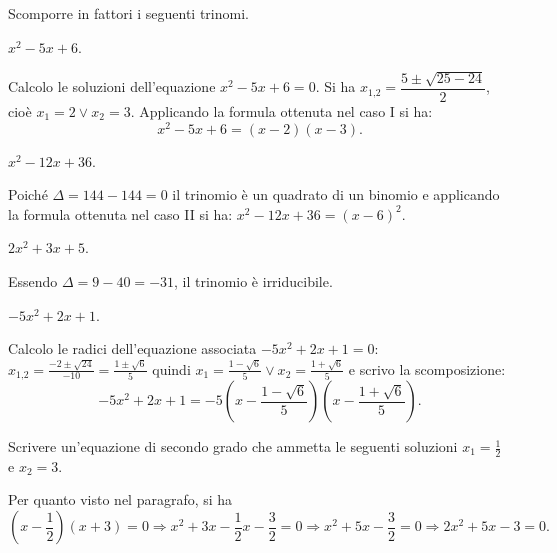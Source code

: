 \begin{exrig}
\begin{esempio}
Scomporre in fattori i seguenti trinomi.
\begin{itemize*}
\item $x^{2} - 5 x + 6$.

Calcolo le soluzioni dell'equazione $x^{2} - 5 x + 6 = 0$. Si ha $x_{1\text{,}2} = \dfrac{5 \pm \sqrt{25 - 24}}{2}$, cioè $x_{1} = 2 \vee x_{2} = 3$. Applicando la formula ottenuta nel caso I si ha: \[x^{2} - 5 x + 6=( x - 2 ) ( x - 3 ).\]
\item $x^{2} - 12 x + 36$.

Poiché $\Delta = 144 - 144 = 0$ il trinomio è un quadrato di un binomio e applicando la formula ottenuta nel caso II si ha: $x^{2} - 12 x + 36=( x - 6 )^{2}$.
\item $2 x^{2} + 3 x + 5$.

Essendo $\Delta=9 - 40=-31$, il trinomio è irriducibile.
\item $- 5 x^{2} + 2 x + 1$.

Calcolo le radici dell'equazione associata $- 5 x^{2} + 2 x + 1 = 0$: $x_{1\text{,}2} = \frac{- 2 \pm \sqrt{24}}{- 10} = \frac{1 \pm \sqrt{6}}{5}$ quindi $x_{1} = \frac{1 - \sqrt{6}}{5} \vee x_{2} = \frac{1 + \sqrt{6}}{5}$ e scrivo la scomposizione: \[- 5 x^{2} + 2 x + 1=- 5 \left( x - \frac{1 - \sqrt{6}}{5} \right) \left( x - \frac{1 + \sqrt{6}}{5} \right).\]
\end{itemize*}
\end{esempio}

\begin{esempio}
Scrivere un'equazione di secondo grado che ammetta le seguenti soluzioni $x_{1} = \frac{1}{2}$ e $x_{2} = 3$.

Per quanto visto nel paragrafo, si ha
\[\left(x-\frac{1}{2} \right) \left(x + 3 \right)=0 \Rightarrow x^{2} + 3 x-\frac{1}{2} x - \frac{3}{2}=0 \Rightarrow x^{2} + 5 x - \frac{3}{2}=0 \Rightarrow 2 x^{2} + 5 x-3=0.\]
\end{esempio}
\end{exrig}

